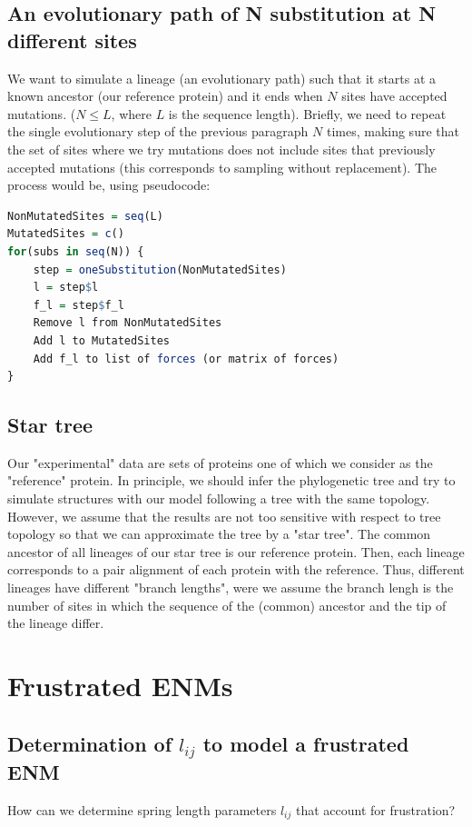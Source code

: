 \documentclass[12pt]{article}
\newcommand{\lij}{l_{ij}}
\begin{document}
\subsection{An evolutionary path of N substitution at N different sites}
We want to simulate a lineage (an evolutionary path) such that it starts at a known ancestor (our reference protein) and it ends when $N$ sites have accepted mutations. ($N \le L$, where $L$ is the sequence length). Briefly, we need to repeat the single evolutionary step of the previous paragraph $N$ times, making sure that the set of sites where we try mutations does not include sites that previously accepted mutations (this corresponds to sampling without replacement). The process would be, using pseudocode:


\begin{lstlisting}[language=R]
NonMutatedSites = seq(L)
MutatedSites = c()
for(subs in seq(N)) {
	step = oneSubstitution(NonMutatedSites)
    l = step$l
    f_l = step$f_l
    Remove l from NonMutatedSites
    Add l to MutatedSites
    Add f_l to list of forces (or matrix of forces)
}
\end{lstlisting}

\subsection{Star tree}

Our "experimental" data are sets of proteins one of which we consider as the "reference" protein. In principle, we should infer the phylogenetic tree and try to simulate structures with our model following a tree with the same topology. However, we assume that the results are not too sensitive with respect to tree topology so that we can approximate the tree by a "star tree". The common ancestor of all lineages of our star tree is our reference protein. Then, each lineage corresponds to a pair alignment of each protein with the reference. Thus, different lineages have different "branch lengths", were we assume the branch lengh is the number of sites in which the sequence of the (common) ancestor and the tip of the lineage differ. 

\cleardoublepage
\appendix

\section{Frustrated ENMs} \label{appendix:frustrated-enm}
\subsection{Determination of ${\lij}$ to model a frustrated ENM}
How can we determine spring length parameters $\lij$ that account for frustration?
\end{document}
